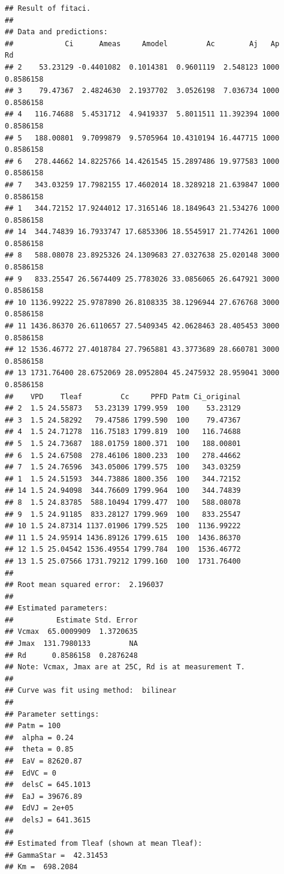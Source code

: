 \documentclass[
]{krantz}
\begin{document}
\begin{verbatim}
## Result of fitaci.
## 
## Data and predictions:
##            Ci      Ameas     Amodel         Ac        Aj   Ap        Rd
## 2    53.23129 -0.4401082  0.1014381  0.9601119  2.548123 1000 0.8586158
## 3    79.47367  2.4824630  2.1937702  3.0526198  7.036734 1000 0.8586158
## 4   116.74688  5.4531712  4.9419337  5.8011511 11.392394 1000 0.8586158
## 5   188.00801  9.7099879  9.5705964 10.4310194 16.447715 1000 0.8586158
## 6   278.44662 14.8225766 14.4261545 15.2897486 19.977583 1000 0.8586158
## 7   343.03259 17.7982155 17.4602014 18.3289218 21.639847 1000 0.8586158
## 1   344.72152 17.9244012 17.3165146 18.1849643 21.534276 1000 0.8586158
## 14  344.74839 16.7933747 17.6853306 18.5545917 21.774261 1000 0.8586158
## 8   588.08078 23.8925326 24.1309683 27.0327638 25.020148 3000 0.8586158
## 9   833.25547 26.5674409 25.7783026 33.0856065 26.647921 3000 0.8586158
## 10 1136.99222 25.9787890 26.8108335 38.1296944 27.676768 3000 0.8586158
## 11 1436.86370 26.6110657 27.5409345 42.0628463 28.405453 3000 0.8586158
## 12 1536.46772 27.4018784 27.7965881 43.3773689 28.660781 3000 0.8586158
## 13 1731.76400 28.6752069 28.0952804 45.2475932 28.959041 3000 0.8586158
##    VPD    Tleaf         Cc     PPFD Patm Ci_original
## 2  1.5 24.55873   53.23139 1799.959  100    53.23129
## 3  1.5 24.58292   79.47586 1799.590  100    79.47367
## 4  1.5 24.71278  116.75183 1799.819  100   116.74688
## 5  1.5 24.73687  188.01759 1800.371  100   188.00801
## 6  1.5 24.67508  278.46106 1800.233  100   278.44662
## 7  1.5 24.76596  343.05006 1799.575  100   343.03259
## 1  1.5 24.51593  344.73886 1800.356  100   344.72152
## 14 1.5 24.94098  344.76609 1799.964  100   344.74839
## 8  1.5 24.83785  588.10494 1799.477  100   588.08078
## 9  1.5 24.91185  833.28127 1799.969  100   833.25547
## 10 1.5 24.87314 1137.01906 1799.525  100  1136.99222
## 11 1.5 24.95914 1436.89126 1799.615  100  1436.86370
## 12 1.5 25.04542 1536.49554 1799.784  100  1536.46772
## 13 1.5 25.07566 1731.79212 1799.160  100  1731.76400
## 
## Root mean squared error:  2.196037 
## 
## Estimated parameters:
##          Estimate Std. Error
## Vcmax  65.0009909  1.3720635
## Jmax  131.7980133         NA
## Rd      0.8586158  0.2876248
## Note: Vcmax, Jmax are at 25C, Rd is at measurement T.
## 
## Curve was fit using method:  bilinear 
## 
## Parameter settings:
## Patm = 100
##  alpha = 0.24
##  theta = 0.85
##  EaV = 82620.87
##  EdVC = 0
##  delsC = 645.1013
##  EaJ = 39676.89
##  EdVJ = 2e+05
##  delsJ = 641.3615
## 
## Estimated from Tleaf (shown at mean Tleaf):
## GammaStar =  42.31453 
## Km =  698.2084
\end{verbatim}
\end{document}
